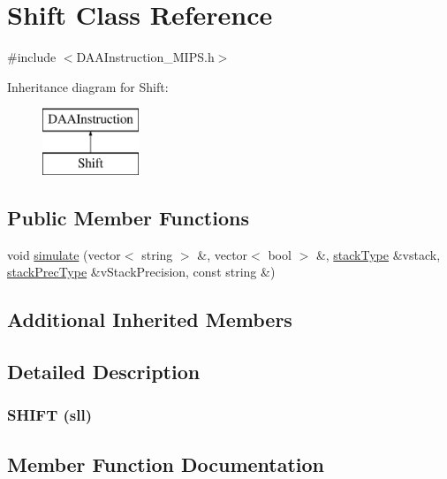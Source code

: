 \hypertarget{classShift}{}\section{Shift Class Reference}
\label{classShift}


{\ttfamily \#include $<$D\+A\+A\+Instruction\+\_\+\+M\+I\+P\+S.\+h$>$}

Inheritance diagram for Shift\+:\begin{figure}[H]
\begin{center}
\leavevmode
\includegraphics[height=2.000000cm]{classShift}
\end{center}
\end{figure}
\subsection*{Public Member Functions}
\begin{DoxyCompactItemize}
\item 
void \hyperlink{classShift_a1dd9f0dff19b0b13ec8f4583ac0231cb}{simulate} (vector$<$ string $>$ \&, vector$<$ bool $>$ \&, \hyperlink{DAAInstruction_8h_a1b0e70ac1a04f06c8132055ed01f589f}{stack\+Type} \&vstack, \hyperlink{DAAInstruction_8h_ac5cb793e9dac3fa9693da78b7e29ab30}{stack\+Prec\+Type} \&v\+Stack\+Precision, const string \&)
\end{DoxyCompactItemize}
\subsection*{Additional Inherited Members}


\subsection{Detailed Description}


 \subsubsection*{S\+H\+I\+FT (sll) }

\subsection{Member Function Documentation}
\mbox{\label{classShift_a1dd9f0dff19b0b13ec8f4583ac0231cb}} 
